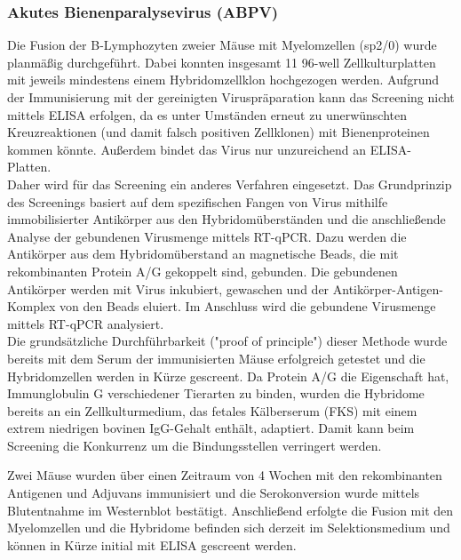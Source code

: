 \subsubsection{Akutes Bienenparalysevirus (ABPV)}
Die Fusion der B-Lymphozyten zweier Mäuse mit Myelomzellen (sp2/0) wurde planmäßig durchgeführt. Dabei konnten insgesamt 11 96-well Zellkulturplatten mit jeweils mindestens einem Hybridomzellklon hochgezogen werden. 
Aufgrund der Immunisierung mit der gereinigten Viruspräparation kann das Screening nicht mittels ELISA erfolgen, da es unter Umständen erneut zu unerwünschten Kreuzreaktionen (und damit falsch positiven Zellklonen) mit Bienenproteinen kommen könnte. Außerdem bindet das Virus nur unzureichend an ELISA-Platten. \\

Daher wird für das Screening ein anderes Verfahren eingesetzt. Das Grundprinzip des Screenings basiert auf dem spezifischen Fangen von Virus mithilfe immobilisierter Antikörper aus den Hybridomüberständen und die anschließende Analyse der gebundenen Virusmenge mittels RT-qPCR. Dazu werden die Antikörper aus dem Hybridomüberstand an magnetische Beads, die mit rekombinanten Protein A/G gekoppelt sind, gebunden. Die gebundenen Antikörper werden mit Virus inkubiert, gewaschen und der Antikörper-Antigen-Komplex von den Beads eluiert. Im Anschluss wird die gebundene Virusmenge mittels RT-qPCR analysiert. \\

Die grundsätzliche Durchführbarkeit ("proof of principle") dieser Methode wurde bereits mit dem Serum der immunisierten Mäuse erfolgreich getestet und die Hybridomzellen werden in Kürze gescreent. Da Protein A/G die Eigenschaft hat, Immunglobulin G verschiedener Tierarten zu binden, wurden die Hybridome bereits an ein Zellkulturmedium, das fetales Kälberserum (FKS) mit einem extrem niedrigen bovinen IgG-Gehalt enthält, adaptiert. Damit kann beim Screening die Konkurrenz um die Bindungsstellen verringert werden.


Zwei Mäuse wurden über einen Zeitraum von 4 Wochen mit den rekombinanten Antigenen und Adjuvans immunisiert und die Serokonversion wurde mittels Blutentnahme im Westernblot bestätigt. Anschließend erfolgte die Fusion mit den Myelomzellen und die Hybridome befinden sich derzeit im Selektionsmedium und können in Kürze initial mit ELISA gescreent werden.


